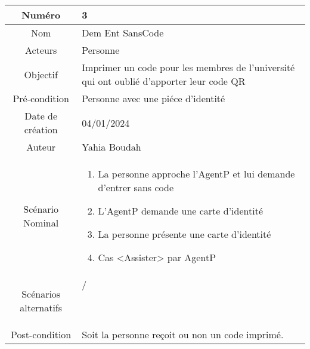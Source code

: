 

\begin{tabular}{ |c|p{12cm}| }
    \hline
    Numéro & 3 \\
    \hline
    Nom & Dem Ent SansCode \\
    \hline
    Acteurs & Personne \\ 
    \hline
    Objectif & Imprimer un code pour les membres de l'université qui ont oublié d'apporter leur code QR \\ 
    \hline
    Pré-condition & Personne avec une piéce d'identité \\
    \hline
    Date de création & 04/01/2024 \\
    \hline
    Auteur & Yahia Boudah \\
    \hline
    Scénario Nominal & \begin{enumerate}
        \item La personne approche l'AgentP et lui demande d'entrer sans code
        \item L'AgentP demande une carte d'identité
        \item La personne présente une carte d'identité
        \item Cas <Assister> par AgentP
    \end{enumerate} \\
    \hline
    Scénarios alternatifs & \begin{description}
        \item[/]
    \end{description} \\
    \hline
    Post-condition & Soit la personne reçoit ou non un code imprimé. \\
    \hline
\end{tabular}